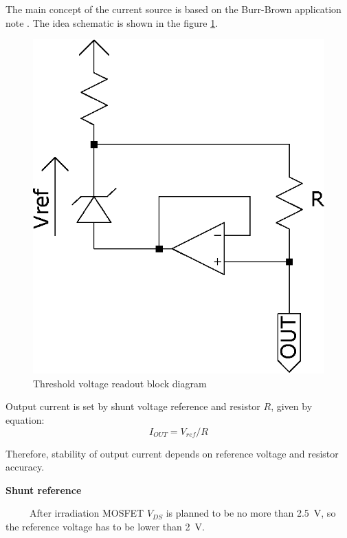         The main concept of the current source is based on the Burr-Brown application note \cite{Make_a_precision_current_source_or_sink}. The idea schematic is shown in the figure \ref{current_source_schematic}.

        \begin{figure}[H]
            \centering
            \includegraphics[width=0.3\paperwidth]{img/06/current_source_schematic.eps}
            \caption{Threshold voltage readout block diagram}
            \label{current_source_schematic}
        \end{figure}

        Output current is set by shunt voltage reference and resistor $R$, given by equation:
        $$I_{OUT} = V_{ref}/R$$

        Therefore, stability of output current depends on reference voltage and resistor accuracy.

        \bigskip \textbf{Shunt reference}

        After irradiation MOSFET $V_{DS}$ is planned to be no more than \SI{2.5}{\volt}, so the reference voltage has to be lower than \SI{2}{\volt}.

